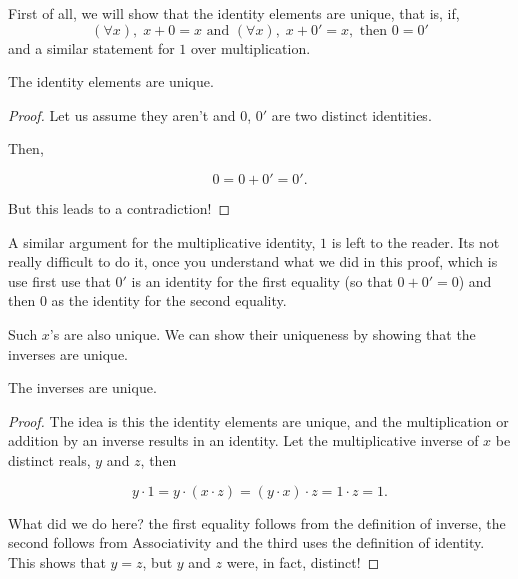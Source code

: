 First of all, we will show that the identity elements are unique, that is, if,
\begin{equation*}
    (\forall x),\; x + 0 = x \text{ and } (\forall x),\; x + 0' = x, \text{ then } 0 = 0'
\end{equation*}
and a similar statement for \(1\) over multiplication.

\begin{proposition}
    The identity elements are unique.
\end{proposition}

\begin{proof}
    Let us assume they aren't and \(0\), \(0'\) are two distinct identities.

    Then, 

    \begin{equation*}
        0 = 0 + 0' = 0'.
    \end{equation*}

    But this leads to a contradiction! \lightning
\end{proof}


A similar argument for the multiplicative identity, \(1\) is left to the reader. Its 
not really difficult to do it, once you understand what we did in this proof, which is 
use first use that \(0'\) is an identity for the first equality (so that \(0 + 0' = 0\)) 
and then \(0\) as the identity for the second equality. 

Such \(x\)'s are also unique. We can show their uniqueness by showing that the inverses are unique.

\begin{proposition}
    The inverses are unique.
\end{proposition}

\begin{proof}
    The idea is this the identity elements are unique, and the multiplication or addition
    by an inverse results in an identity. Let the multiplicative inverse of \(x\) be 
    distinct reals, \(y\) and \(z\), then  

    \begin{equation*}
        y \cdot 1 = y \cdot (x \cdot z) = (y \cdot x) \cdot z = 1 \cdot z = 1.
    \end{equation*}

    What did we do here? the first equality follows from the definition 
    of inverse, the second follows from Associativity and the third uses the 
    definition of identity. This shows that \(y = z\), but \(y\) and \(z\) 
    were, in fact, distinct! \lightning

\end{proof}

